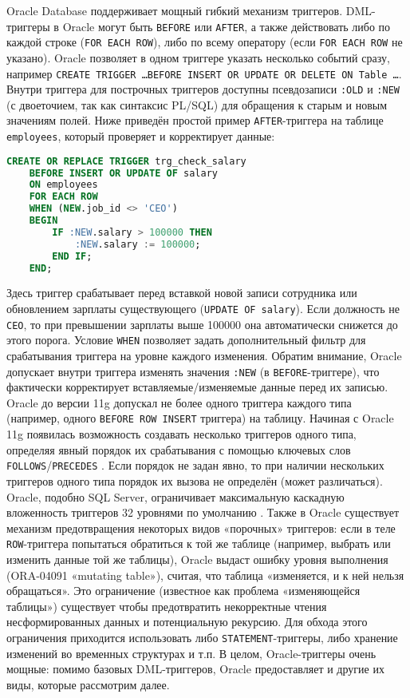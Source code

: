 Oracle Database поддерживает мощный гибкий механизм триггеров. DML-триггеры в Oracle могут быть \texttt{BEFORE} или \texttt{AFTER}, а также действовать либо по каждой строке (\texttt{FOR EACH ROW}), либо по всему оператору (если \texttt{FOR EACH ROW} не указано). Oracle позволяет в одном триггере указать несколько событий сразу, например \texttt{CREATE TRIGGER \ldots BEFORE INSERT OR UPDATE OR DELETE ON Table \ldots}. 
 Внутри триггера для построчных триггеров доступны псевдозаписи \texttt{:OLD} и \texttt{:NEW} (с двоеточием, так как синтаксис PL/SQL) для обращения к старым и новым значениям полей. Ниже приведён простой пример \texttt{AFTER}-триггера на таблице \texttt{employees}, который проверяет и корректирует данные:
 \begin{lstlisting}[language=SQL]
    CREATE OR REPLACE TRIGGER trg_check_salary
    BEFORE INSERT OR UPDATE OF salary
    ON employees
    FOR EACH ROW
    WHEN (NEW.job_id <> 'CEO')
    BEGIN
        IF :NEW.salary > 100000 THEN
            :NEW.salary := 100000;
        END IF;
    END;
 \end{lstlisting}

 Здесь триггер срабатывает перед вставкой новой записи сотрудника или обновлением зарплаты существующего (\texttt{UPDATE OF salary}). Если должность не \texttt{CEO}, то при превышении зарплаты выше 100000 она автоматически снижется до этого порога. Условие \texttt{WHEN} позволяет задать дополнительный фильтр для срабатывания триггера на уровне каждого изменения. Обратим внимание, Oracle допускает внутри триггера изменять значения \texttt{:NEW} (в \texttt{BEFORE}-триггере), что фактически корректирует вставляемые/изменяемые данные перед их записью.
 Oracle до версии 11g допускал не более одного триггера каждого типа (например, одного \texttt{BEFORE ROW INSERT} триггера) на таблицу. Начиная с Oracle 11g появилась возможность создавать несколько триггеров одного типа, определяя явный порядок их срабатывания с помощью ключевых слов \texttt{FOLLOWS}/\texttt{PRECEDES}  \autocite{oracledbdoc6}. Если порядок не задан явно, то при наличии нескольких триггеров одного типа порядок их вызова не определён (может различаться). Oracle, подобно SQL Server, ограничивает максимальную каскадную вложенность триггеров 32 уровнями по умолчанию  \autocite{oracledbdoc8}. 
 Также в Oracle существует механизм предотвращения некоторых видов «порочных» триггеров: если в теле \texttt{ROW}-триггера попытаться обратиться к той же таблице (например, выбрать или изменить данные той же таблицы), Oracle выдаст ошибку уровня выполнения (ORA-04091 «mutating table»), считая, что таблица «изменяется, и к ней нельзя обращаться». Это ограничение (известное как проблема «изменяющейся таблицы») существует чтобы предотвратить некорректные чтения несформированных данных и потенциальную рекурсию. Для обхода этого ограничения приходится использовать либо \texttt{STATEMENT}-триггеры, либо хранение изменений во временных структурах и т.п. В целом, Oracle-триггеры очень мощные: помимо базовых DML-триггеров, Oracle предоставляет и другие их виды, которые рассмотрим далее.


